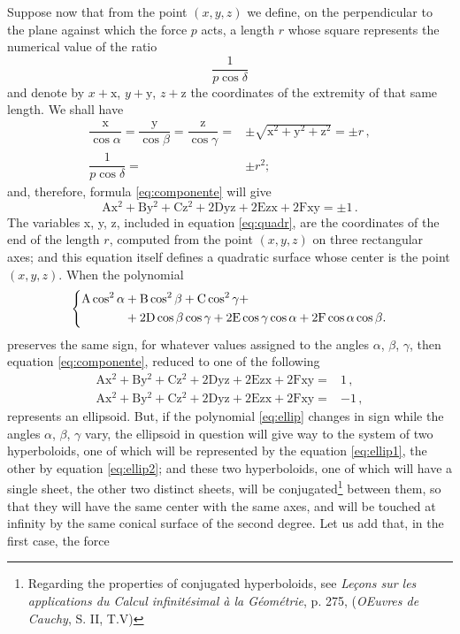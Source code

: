 \documentclass[leqno,openright,smallroyalvopaper,8pt,twoside,showtrims]{memoir}
\begin{document}
Suppose now that from the point $(x, y, z)$ we define, on the perpendicular to the plane against which the force $p$ acts, a length $r$ whose square represents the numerical value of the ratio
\begin{equation}
\dfrac{1}{p\cos\delta}
\end{equation}
and denote by $x + \text{x}$, $y + \text{y}$, $z + \text{z}$ the coordinates of the extremity of that same length. We shall have
\begin{align}
\dfrac{\text{x}}{\cos\alpha}=\dfrac{\text{y}}{\cos\beta}=\dfrac{\text{z}}{\cos\gamma}=&\pm\sqrt{\text{x}^2+\text{y}^2+\text{z}^2}=\pm r\,,\\
\dfrac{1}{p\cos\delta}=&\pm r^2;
\end{align}
and, therefore, formula \eqref{eq:componente} will give
\begin{equation}\label{eq:quadr}
\text{A}\text{x}^2+\text{B}\text{y}^2+\text{C}\text{z}^2+2\text{Dyz}+2\text{Ezx}+2\text{Fxy} = \pm 1\,.
\end{equation}
The variables x, y, z, included in equation \eqref{eq:quadr}, are the coordinates of the end of the length $r$, computed from the point $(x, y, z)$ on three rectangular axes; and this equation itself defines a quadratic surface whose center is the point $(x, y, z)$. When the polynomial
\begin{equation}\label{eq:ellip}
\begin{dcases}
\begin{aligned}
\text{A}\cos^2\alpha &+\text{B}\cos^2\beta+\text{C}\cos^2\gamma+\\
&+2\text{D}\cos\beta\cos\gamma +2\text{E}\cos\gamma\cos\alpha+2\text{F}\cos\alpha\cos\beta.
\end{aligned}
\end{dcases}
\end{equation}
preserves the same sign, for whatever values assigned to the angles $\alpha$, $\beta$, $\gamma$, then equation \eqref{eq:componente}, reduced to one of the following
\begin{align}
\text{A}\text{x}^2+\text{B}\text{y}^2+\text{C}\text{z}^2+2\text{Dyz}+2\text{Ezx}+2\text{Fxy} =& 1\,,\label{eq:ellip1}\\
\text{A}\text{x}^2+\text{B}\text{y}^2+\text{C}\text{z}^2+2\text{Dyz}+2\text{Ezx}+2\text{Fxy} =& -1\,,\label{eq:ellip2}
\end{align}
represents an ellipsoid. But, if the polynomial \eqref{eq:ellip} changes in sign while the angles $\alpha$, $\beta$, $\gamma$ vary, the ellipsoid in question will give way to the system of two hyperboloids, one of which will be represented by the equation \eqref{eq:ellip1}, the other by equation \eqref{eq:ellip2}; and these two hyperboloids, one of which will have a single sheet, the other two distinct sheets, will be conjugated\footnote{Regarding the properties of conjugated hyperboloids, see \emph{Le\c{c}ons sur les applications du Calcul infinit\'esimal \`a la G\'eom\'etrie}, p. 275, (\emph{OEuvres de Cauchy}, S. II, T.V)} between them, so that they will have the same center with the same axes, and will be touched at infinity by the same conical surface of the second degree. Let us add that, in the first case, the force
\end{document}
